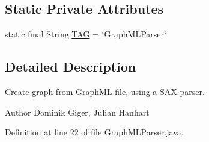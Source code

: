 \subsection*{Static Private Attributes}
\begin{DoxyCompactItemize}
\item 
static final String \hyperlink{classch_1_1zhaw_1_1ba10__bsha__1_1_1graph_1_1GraphMLParser_a7df7fc4703a593c56c984fef423b7973}{TAG} = \char`\"{}GraphMLParser\char`\"{}
\end{DoxyCompactItemize}


\subsection{Detailed Description}
Create \hyperlink{namespacech_1_1zhaw_1_1ba10__bsha__1_1_1graph}{graph} from GraphML file, using a SAX parser.

\begin{DoxyAuthor}{Author}
Dominik Giger, Julian Hanhart 
\end{DoxyAuthor}


Definition at line 22 of file GraphMLParser.java.

